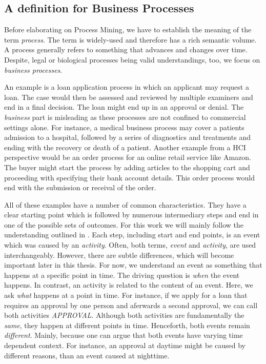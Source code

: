 \documentclass[./../../paper.tex]{subfiles}
\begin{document}
\subsection{A definition for Business Processes}
Before elaborating on Process Mining, we have to establish the meaning of the term \emph{process}. The term is widely-used and therefore has a rich semantic volume. A process generally refers to something that advances and changes over time\autocite{_DefinitionPROCESS_}.
Despite, legal or biological processes being valid understandings, too, we focus on \emph{business processes}.

An example is a loan application process in which an applicant may request a loan. The case would then be assessed and reviewed by multiple examiners and end in a final decision. The loan might end up in an approval or denial. The \emph{business} part is misleading as these processes are not confined to commercial settings alone. For instance, a medical business process may cover a patients admission to a hospital, followed by a series of diagnostics and treatments and ending with the recovery or death of a patient. Another example from a \gls{HCI} perspective would be an order process for an online retail service like Amazon. The buyer might start the process by adding articles to the shopping cart and proceeding with specifying their bank account details. This order process would end with the submission or receival of the order.

All of these examples have a number of common characteristics. They have a clear starting point which is followed by numerous intermediary steps and end in one of the possible sets of outcomes. For this work we will mainly follow the understanding outlined in \citeauthor{vanderaalst_ProcessMiningManifesto_2012}\autocite{vanderaalst_ProcessMiningManifesto_2012}. Each step, including start and end points, is an \gls{event} which was caused by an \emph{activity}. Often, both terms, \emph{event} and \emph{activity}, are used interchangeably. However, there are subtle differences, which will become important later in this thesis. For now, we understand an event as something that happens at a specific point in time. The driving question is \emph{when} the event happens. In contrast, an activity is related to the content of an event. Here, we ask \emph{what} happens at a point in time. For instance, if we apply for a loan that requires an approval by one person and aferwards a second approval, we can call both activities \emph{APPROVAL}. Although both activities are fundamentally the \emph{same}, they happen at different points in time. Henceforth, both events remain \emph{different}. Mainly, because one can argue that both events have varying time dependent context. For instance, an approval at daytime might be caused by different reasons, than an event caused at nighttime.     
\end{document}
